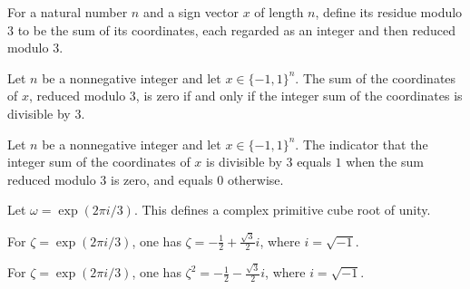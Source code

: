 \begin{definition}
\label{FABL.modThreeResidue}
\leanok
For a natural number $n$ and a sign vector $x$ of length $n$, define its residue modulo
$3$ to be the sum of its coordinates, each regarded as an integer and then reduced
modulo $3$.
\end{definition}

\begin{theorem}
\label{FABL.modThreeResidue_eq_zero_iff}
\leanok
{}
Let $n$ be a nonnegative integer and let $x\in\{-1,1\}^n$. The sum of the coordinates
of $x$, reduced modulo $3$, is zero if and only if the integer sum of the coordinates is
divisible by $3$.
\end{theorem}

\begin{theorem}
\label{FABL.modThree_eq_residueIndicator}
\leanok
{}
Let $n$ be a nonnegative integer and let $x\in\{-1,1\}^n$. The indicator that the
integer sum of the coordinates of $x$ is divisible by $3$ equals $1$ when the sum
reduced modulo $3$ is zero, and equals $0$ otherwise.
\end{theorem}

\begin{definition}
\label{FABL.modThreeCubicRoot}
\leanok
Let $\omega=\exp(2\pi i/3)$. This defines a complex primitive cube root of unity.
\end{definition}

\begin{theorem}
\label{FABL.modThreeCubicRoot_eq}
\leanok
{}
For $\zeta=\exp(2\pi i/3)$, one has $\zeta=-\frac12+\frac{\sqrt3}{2}i$, where
$i=\sqrt{-1}$.
\end{theorem}

\begin{theorem}
\label{FABL.modThreeCubicRoot_sq}
\leanok
{}
For $\zeta=\exp(2\pi i/3)$, one has $\zeta^2=-\frac12-\frac{\sqrt3}{2}i$, where
$i=\sqrt{-1}$.
\end{theorem}

